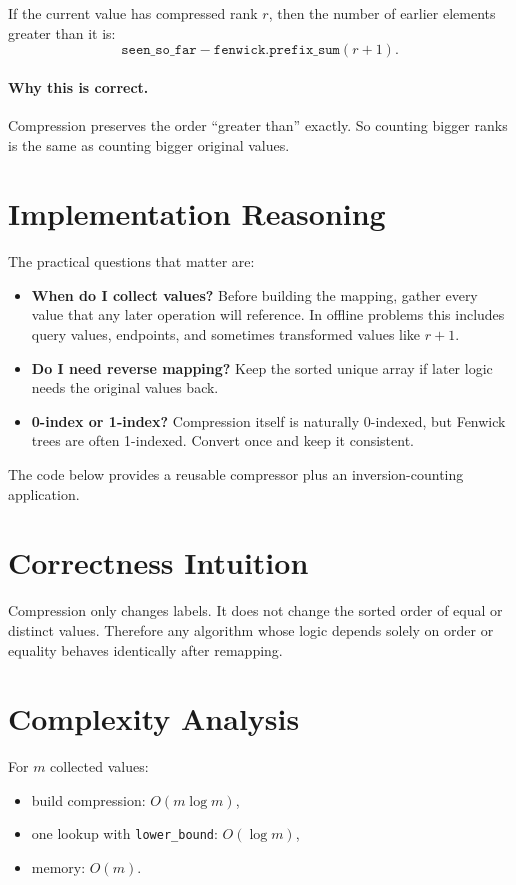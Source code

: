 If the current value has compressed rank \(r\), then the number of earlier elements greater than it is:
\[
\texttt{seen\_so\_far} - \texttt{fenwick.prefix\_sum}(r+1).
\]

\paragraph{Why this is correct.}
Compression preserves the order ``greater than'' exactly. So counting bigger ranks is the same as counting bigger
original values.

\section*{Implementation Reasoning}

The practical questions that matter are:

\begin{itemize}
  \item \textbf{When do I collect values?} Before building the mapping, gather every value that any later operation will
  reference. In offline problems this includes query values, endpoints, and sometimes transformed values like \(r+1\).
  \item \textbf{Do I need reverse mapping?} Keep the sorted unique array if later logic needs the original values back.
  \item \textbf{0-index or 1-index?} Compression itself is naturally 0-indexed, but Fenwick trees are often 1-indexed.
  Convert once and keep it consistent.
\end{itemize}

The code below provides a reusable compressor plus an inversion-counting application.

\section*{Correctness Intuition}

Compression only changes labels. It does not change the sorted order of equal or distinct values. Therefore any
algorithm whose logic depends solely on order or equality behaves identically after remapping.

\section*{Complexity Analysis}

For \(m\) collected values:

\begin{itemize}
  \item build compression: \(O(m \log m)\),
  \item one lookup with \texttt{lower\_bound}: \(O(\log m)\),
  \item memory: \(O(m)\).
\end{itemize}

